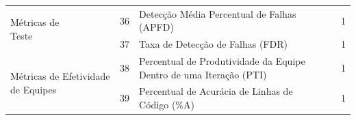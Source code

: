 \documentclass[sigconf]{acmart}
\begin{document}
\begin{table}[t]
\begin{tabular}{p{3.6cm} c p{8cm} c c}
\multirow{2}{2.6cm}{\parbox{3.2cm}{Métricas de\\Teste}}
 & 36 & Detecção Média Percentual de Falhas (APFD)                        & \cite{Ilays:2024}    & 1 \\
 & 37 & Taxa de Detecção de Falhas (FDR)                                  & \cite{Ilays:2024}    & 1 \\

\multirow{2}{2.6cm}{\parbox{3.2cm}{Métricas de Efetividade de Equipes}}
 & 38 & Percentual de Produtividade da Equipe Dentro de uma Iteração (PTI) & \cite{Misra:2021}   & 1 \\
 & 39 & Percentual de Acurácia de Linhas de Código (\%A)                   & \cite{Misra:2021}   & 1 \\
\bottomrule
\end{tabular}
\end{table}



\end{document}

